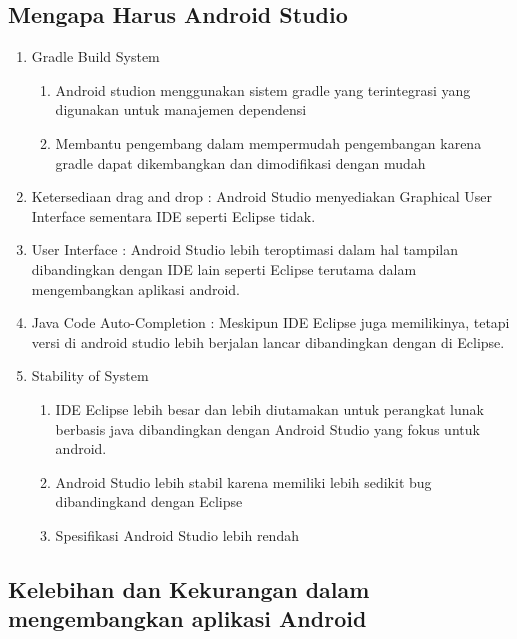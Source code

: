 \subsection{Mengapa Harus Android Studio}
\begin{enumerate}
	\item Gradle Build System
	\begin{enumerate}
		\item Android studion menggunakan sistem gradle yang terintegrasi yang digunakan untuk manajemen dependensi
		\item Membantu pengembang dalam mempermudah pengembangan karena gradle dapat dikembangkan dan dimodifikasi dengan mudah
	\end{enumerate}
	\item Ketersediaan drag and drop : Android Studio menyediakan Graphical User Interface sementara IDE seperti Eclipse tidak.
	\item User Interface : Android Studio lebih teroptimasi dalam hal tampilan dibandingkan dengan IDE lain seperti Eclipse terutama dalam mengembangkan aplikasi android.
	\item Java Code Auto-Completion : Meskipun IDE Eclipse juga memilikinya, tetapi versi di android studio lebih berjalan lancar dibandingkan dengan di Eclipse.
	\item Stability of System 
	\begin{enumerate}
		\item IDE Eclipse lebih besar dan lebih diutamakan untuk perangkat lunak berbasis java dibandingkan dengan Android Studio yang fokus untuk android.
		\item Android Studio lebih stabil karena memiliki lebih sedikit bug dibandingkand dengan Eclipse
		\item Spesifikasi Android Studio lebih rendah
	\end{enumerate}
\end{enumerate}

\subsection{Kelebihan dan Kekurangan dalam mengembangkan aplikasi Android}

